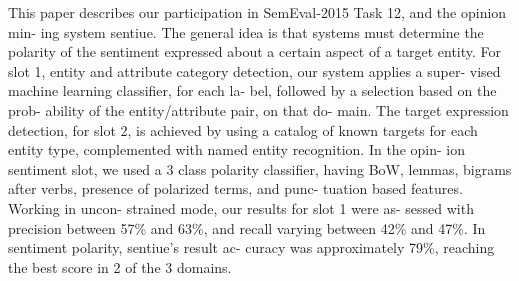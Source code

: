 This paper describes our participation in SemEval-2015 Task 12, and the opinion min- ing system sentiue. The general idea is that systems must determine the polarity of the sentiment expressed about a certain aspect of a target entity. For slot 1, entity and attribute category detection, our system applies a super- vised machine learning classifier, for each la- bel, followed by a selection based on the prob- ability of the entity/attribute pair, on that do- main. The target expression detection, for slot 2, is achieved by using a catalog of known targets for each entity type, complemented with named entity recognition. In the opin- ion sentiment slot, we used a 3 class polarity classifier, having BoW, lemmas, bigrams after verbs, presence of polarized terms, and punc- tuation based features. Working in uncon- strained mode, our results for slot 1 were as- sessed with precision between 57\% and 63\%, and recall varying between 42\% and 47\%. In sentiment polarity, sentiue's result ac- curacy was approximately 79\%, reaching the best score in 2 of the 3 domains.
